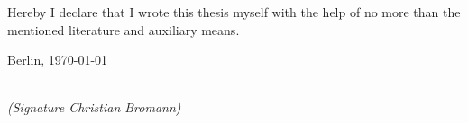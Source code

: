 \newpage

\thispagestyle{empty}

\begin{large}

\vspace*{6cm}

\noindent
Hereby I declare that I wrote this thesis myself with the help of no more than the
mentioned literature and auxiliary means.
\vspace{2cm}

\noindent
Berlin, \today

\vspace{3cm}

\hspace*{7cm}%
\dotfill\\
\hspace*{8.5cm}%
\textit{(Signature Christian Bromann)}

\end{large}
